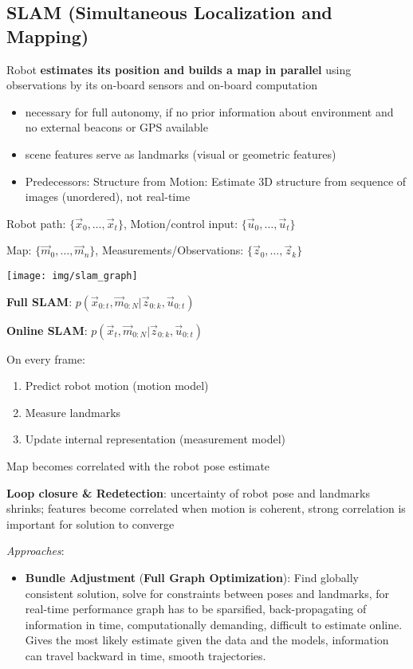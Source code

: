 \documentclass[fontsize=6pt]{scrartcl}
\begin{document}
\begin{multicols*}{4}
\subsection*{SLAM (Simultaneous Localization and Mapping)}

Robot \textbf{estimates its position and builds a map in parallel} using observations by its on-board sensors and on-board computation

\begin{itemize}
\item necessary for full autonomy, if no prior information about environment and no external beacons or GPS available
\item scene features serve as landmarks (visual or geometric features)
\item Predecessors: Structure from Motion: Estimate 3D structure from sequence of images (unordered), not real-time
\end{itemize}

Robot path: $\{\vec x_0, \ldots, \vec x_t\}$, Motion/control input: $\{\vec u_0, \ldots, \vec u_t\}$

Map: $\{\vec m_0, \ldots, \vec m_n\}$, Measurements/Observations: $\{\vec z_0, \ldots, \vec z_k\}$

{\centering
	\texttt{[image: img/slam\_graph]}
\par}

\textbf{Full SLAM}: $p(\vec x_{0:t}, \vec m_{0:N}| \vec z_{0:k}, \vec u_{0:t})$

\textbf{Online SLAM}: $p(\vec x_t, \vec m_{0:N}| \vec z_{0:k}, \vec u_{0:t})$

On every frame:
\begin{enumerate}
\item Predict robot motion (motion model)
\item Measure landmarks
\item Update internal representation (measurement model)
\end{enumerate}

Map becomes correlated with the robot pose estimate

\textbf{Loop closure \& Redetection}: uncertainty of robot pose and landmarks shrinks; features become correlated when motion is coherent, strong correlation is important for solution to converge

\textit{Approaches}:
\begin{itemize}
	\item \textbf{Bundle Adjustment} (\textbf{Full Graph Optimization}):
		Find globally consistent solution, solve for constraints between poses and landmarks, for real-time performance graph has to be sparsified, back-propagating of information in time, computationally demanding, difficult to estimate online. Gives the most likely estimate given the data and the models, information can travel
		backward in time, smooth trajectories.


\end{itemize}
\end{multicols*}
\end{document}
